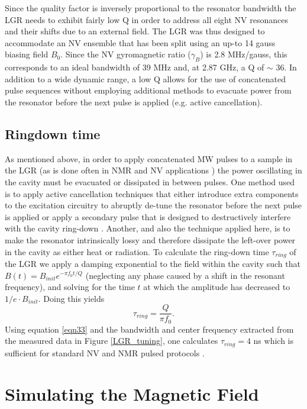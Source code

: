 Since the quality factor is inversely proportional to the resonator bandwidth the LGR needs to exhibit fairly low Q in order to address all eight NV resonances and their shifts due to an external field. The LGR was thus designed to accommodate an NV ensemble that has been split using an up-to 14 gauss biasing field $B_0$. Since the NV gyromagnetic ratio ($\gamma_B$) is 2.8 MHz/gauss, this corresponds to an ideal bandwidth of 39 MHz and, at 2.87 GHz, a Q of $\sim$ 36. In addition to a wide dynamic range, a low Q allows for the use of concatenated pulse sequences without employing additional methods to evacuate power from the resonator before the next pulse is applied (e.g. active cancellation). 

\subsection{Ringdown time}\label{ringdown}

As mentioned above, in order to apply concatenated MW pulses to a sample in the LGR (as is done often in NMR and NV applications \cite{}) the power oscillating in the cavity must be evacuated or dissipated in between pulses. One method used is to apply active cancellation techniques that either introduce extra components to the excitation circuitry to abruptly de-tune the resonator before the next pulse is applied  \cite{} or apply a secondary pulse that is designed to destructively interfere with the cavity ring-down \cite{Franck2015Active}. Another, and also the technique applied here, is to make the resonator intrinsically lossy and therefore dissipate the left-over power in the cavity as either heat or radiation. To calculate the ring-down time $\tau_{ring}$ of the LGR we apply a damping exponential to the field within the cavity such that $B(t) = B_{init}e^{-\pi f_0t/Q}$ (neglecting any phase caused by a shift in the resonant frequency), and solving for the time $t$ at which the amplitude has decreased to $1/e \cdot B_{init}$. Doing this yields
\begin{equation}\label{eqn33}
\tau_{ring} = \frac{Q}{\pi f_0}.
\end{equation} 
Using equation \ref{eqn33} and the bandwidth and center frequency extracted from the measured data in Figure \ref{LGR_tuning}, one calculates $\tau_{ring} = 4$ ns which is sufficient for standard NV and NMR pulsed protocols \cite{Smeltzer2009Robust,Jelezko2004Observation,Steiner2010Universal}.

\section{Simulating the Magnetic Field} \label{simField}


